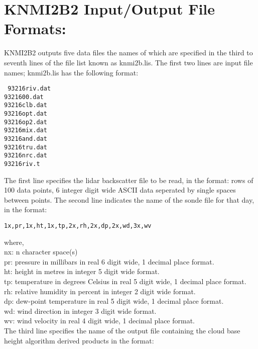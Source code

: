 \section{KNMI2B2 Input/Output File Formats:}
  
KNMI2B2 outputs five data files the names of which are specified in the 
third to seventh lines of the file list known as knmi2b.lis. The first
two lines are input file names; knmi2b.lis has the following format:


\noindent
{\tt
93216riv.dat\\  
9321600.dat\\
93216clb.dat\\  
93216opt.dat\\
93216op2.dat\\
93216mix.dat\\
93216and.dat\\
93216tru.dat\\
93216nrc.dat\\
93216riv.t\\
}


\noindent
The first line specifies the lidar backscatter file to be read,
in the format: rows of 100 data points, 6 integer digit wide ASCII data seperated 
by single spaces between points.
\noindent
The second line indicates the name of the sonde file for that day,
in the format:

\begin{center}
 	{\tt 1x,pr,1x,ht,1x,tp,2x,rh,2x,dp,2x,wd,3x,wv}
\end{center}
\noindent
where,\\
\noindent
nx: n character space(s)\\
pr: pressure in millibars in real 6 digit wide, 1 decimal place format.\\
ht: height in metres in integer 5 digit wide format.\\
tp: temperature in degrees Celsius in real 5 digit wide, 1 decimal place format.\\
rh: relative humidity in percent in integer 2 digit wide format.\\
dp: dew-point temperature in real 5 digit wide, 1 decimal place format.\\
wd: wind direction in integer 3 digit wide format.\\
wv: wind velocity in real 4 digit wide, 1 decimal place format.\\

The third line specifies the name of the output file containing the
cloud base height algorithm \cite{srpwsaic} derived products in the format:

